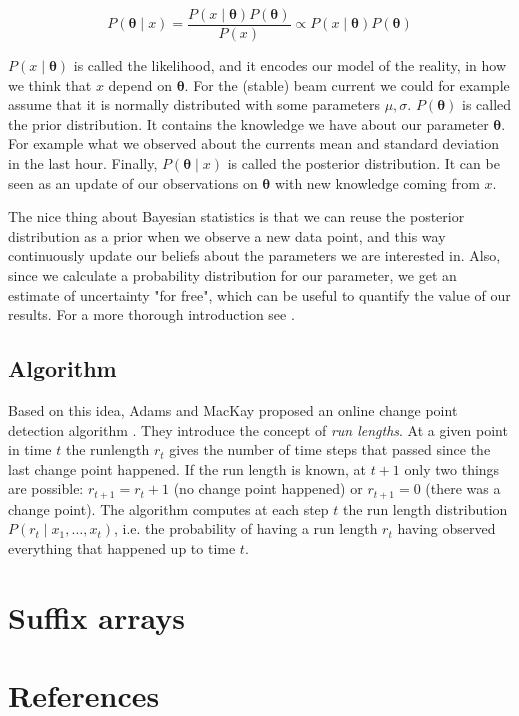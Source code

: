 \documentclass[12pt,a4paper]{article}
\begin{document}
\begin{equation*}
P\left(\bm \theta \mid x\right)=\frac{P\left(x \mid \bm\theta\right)P\left(\bm \theta\right)}{P\left(x\right)} \propto P\left(x \mid \bm\theta\right)P\left(\bm \theta\right)
\end{equation*}

$P\left(x \mid \bm\theta\right)$ is called the likelihood, and it encodes our model of the reality, in how we think that $x$ depend on $\bm\theta$. For the (stable) beam current we could for example assume that it is normally distributed with some parameters $\mu, \sigma$. $P\left(\bm \theta\right)$ is called the prior distribution. It contains the knowledge we have about our parameter $\bm\theta$. For example what we observed about the currents mean and standard deviation in the last hour. Finally, $P\left(\bm \theta \mid x\right)$ is called the posterior distribution. It can be seen as an update of our observations on $\bm\theta$ with new knowledge coming from $x$.

The nice thing about Bayesian statistics is that we can reuse the posterior distribution as a prior when we observe a new data point, and this way continuously update our beliefs about the parameters we are interested in. Also, since we calculate a probability distribution for our parameter, we get an estimate of uncertainty "for free", which can be useful to quantify the value of our results. For a more thorough introduction see \cite{Spiegelhalter:Bayesianstatistics,Brooks-Bartlett:Probabilityconceptsexplained}.

\subsection{Algorithm}

Based on this idea, Adams and MacKay proposed an online change point detection algorithm \cite{Adams:BayesianOnlineChangepoint}. They introduce the concept of \textit{run lengths}. At a given point in time $t$ the runlength $r_t$ gives the number of time steps that passed since the last change point happened. If the run length is known, at $t+1$ only two things are possible: $r_{t+1}=r_t + 1$ (no change point happened) or $r_{t+1}=0$ (there was a change point). The algorithm computes at each step $t$ the run length distribution $P(r_t \mid x_1,\dots,x_t)$, i.e. the probability of having a run length $r_t$ having observed everything that happened up to time $t$.

\hypertarget{suffix-arrays}{%
\section{Suffix arrays}\label{suffix-arrays}}
\hypertarget{references}{%
\section*{References}\label{references}}

\hypertarget{refs}{}
\printbibliography
\end{document}
